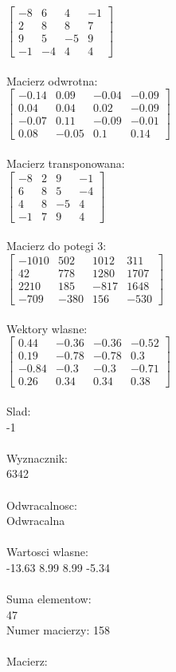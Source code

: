\documentclass[a4paper,12pt]{article}
\begin{document}
$\begin{bmatrix} -8&6&4&-1\\2&8&8&7\\9&5&-5&9\\-1&-4&4&4 \end{bmatrix}$
\\
\\
Macierz odwrotna:\\

$\begin{bmatrix} -0.14&0.09&-0.04&-0.09\\0.04&0.04&0.02&-0.09\\-0.07&0.11&-0.09&-0.01\\0.08&-0.05&0.1&0.14 \end{bmatrix}$
\\
\\
Macierz transponowana:\\

$\begin{bmatrix} -8&2&9&-1\\6&8&5&-4\\4&8&-5&4\\-1&7&9&4 \end{bmatrix}$
\\
\\
Macierz do potegi 3:\\

$\begin{bmatrix} -1010&502&1012&311\\42&778&1280&1707\\2210&185&-817&1648\\-709&-380&156&-530 \end{bmatrix}$
\\
\\
Wektory wlasne:\\

$\begin{bmatrix} 0.44&-0.36&-0.36&-0.52\\0.19&-0.78&-0.78&0.3\\-0.84&-0.3&-0.3&-0.71\\0.26&0.34&0.34&0.38 \end{bmatrix}$
\\
\\
Slad:\\
-1
\\
\\
Wyznacznik:\\
6342
\\
\\
Odwracalnosc:\\
Odwracalna
\\
\\
Wartosci wlasne:\\
-13.63 8.99 8.99 -5.34
\\
\\
Suma elementow:\\
47
\\
\newpage
Numer macierzy:
158
\\
\\
Macierz:\\
\end{document}

